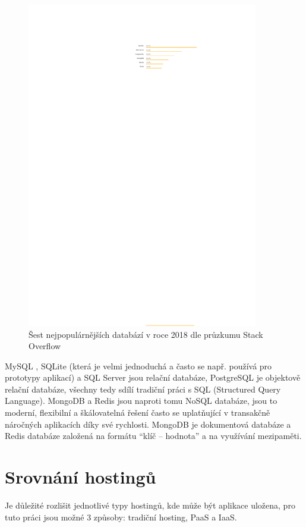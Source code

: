     \begin{figure}\centering
    	\includegraphics[width=0.9\textwidth]{img/stack-stats-db}
    	\caption[Popularita databází v roce 2018 dle průzkumu Stack Overflow]{Šest nejpopulárnějších databází v roce 2018 dle průzkumu Stack Overflow \cite{stack-stats18}}\label{fig:stack-stats18-db}
    \end{figure}
    
    MySQL \cite{db1}, SQLite \cite{db2} (která je velmi jednoduchá a často se např. používá pro prototypy aplikací) a SQL Server jsou relační databáze, PostgreSQL \cite{db3} je objektově relační databáze, všechny tedy sdílí tradiční práci s SQL (Structured Query Language). MongoDB \cite{db4} a Redis \cite{db5} jsou naproti tomu NoSQL databáze, jsou to moderní, flexibilní a škálovatelná řešení často se uplatňující v transakčně náročných aplikacích díky své rychlosti. MongoDB je dokumentová databáze a Redis databáze založená na formátu \enquote{klíč -- hodnota} a na využívání mezipaměti.
    
    
    \section{Srovnání hostingů}
    Je důležité rozlišit jednotlivé typy hostingů, kde může být aplikace uložena, pro tuto práci jsou možné 3 způsoby: tradiční hosting, PaaS a IaaS.
    

